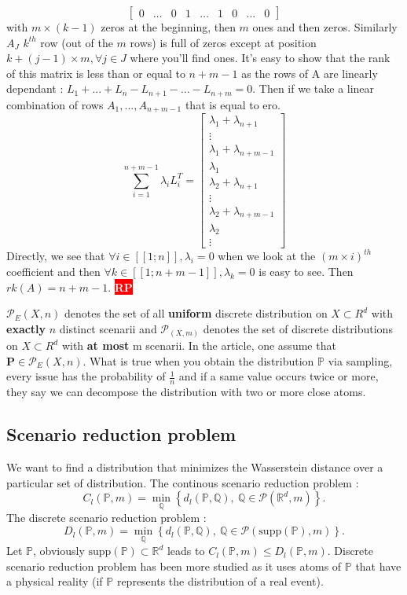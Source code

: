 \documentclass{amsart}
\newcommand{\nb}[3]{
		{\colorbox{#2}{\bfseries\sffamily\tiny\textcolor{white}{#1}}}
		{\textcolor{#2}{\text{$\blacktriangleright$}{\textcolor{#2}{#3}}\text{$\blacktriangleleft$}}}}
\newcommand{\rp}[1]{\nb{RP}{red}{#1}}
\begin{document}
$$\begin{bmatrix}
    0&\hdots&0&1&\hdots&1&0&\hdots&0
\end{bmatrix}$$
with $m\times(k-1)$ zeros at the beginning, then $m$ ones and then zeros. 
\newline
Similarly $A_J$ $k^{th}$ row (out of the $m$ rows) is full of zeros except at position $k+(j-1)\times m, \forall j\in J$ where you'll find ones. It's easy to show that the rank of this matrix is less than or equal to $n+m-1$ as the rows of A are linearly dependant : $L_1+...+L_n-L_{n+1}-...-L_{n+m}=0$. Then if we take a linear combination of rows $A_1,...,A_{n+m-1}$ that is equal to ero. $$
\sum_{i=1}^{n+m-1}\lambda_iL_i^T=\begin{bmatrix}
    \lambda_1+\lambda_{n+1}\\ \vdots\\ \lambda_1+\lambda_{n+m-1}\\ \lambda_{1} \\ \lambda_2+\lambda_{n+1} \\ \vdots \\ \lambda_2+\lambda_{n+m-1}\\ \lambda_2  \\ \vdots
\end{bmatrix}
$$
Directly, we see that $\forall i \in [\![1;n]\!], \lambda_i=0$ when we look at the $(m\times i)^{th}$ coefficient and then $\forall k\in[\![1;n+m-1]\!], \lambda_k=0$ is easy to see. Then $rk(A)=n+m-1$. \rp{kind of useless as we know that the number of variables in basis is $n+m$ (number of constraints) but can be the starting point of sparsity explanation if I study regularization as Benoît mentionned}
\newline

$\mathcal{P}_E(X,n)$ denotes the set of all \textbf{uniform} discrete distribution on $X\subset R^d$ with \textbf{exactly} $n$ distinct scenarii and $\mathcal{P}_(X,m)$ denotes the set of discrete distributions on $X\subset R^d$ with \textbf{at most} m scenarii. In the article, one assume that $\mathbf{P}\in\mathcal{P}_E(X,n)$. What is true when you obtain the distribution $\mathbb{P}$ via sampling, every issue has the probability of $\frac{1}{n}$ and if a same value occurs twice or more, they say we can decompose the distribution with two or more close atoms.
\subsection{Scenario reduction problem}
We want to find a distribution that minimizes the Wasserstein distance over a particular set of distribution. The continous scenario reduction problem :
$$
C_l(\mathbb{P},m)=\min_\mathbb{Q}\left\{d_l(\mathbb{P},\mathbb{Q}),\: \mathbb{Q}\in\mathcal{P}(\mathbb{R}^d,m)\right\}. 
$$
The discrete scenario reduction problem :
$$
D_l(\mathbb{P},m)=\min_\mathbb{Q}\left\{d_l(\mathbb{P},\mathbb{Q}),\: \mathbb{Q}\in\mathcal{P}(\text{supp}(\mathbb{P}),m)\right\}.
$$
Let $\mathbb{P}$, obviously $\text{supp}(\mathbb{P})\subset \mathbb{R}^d$ leads to $C_l(\mathbb{P},m)\leq D_l(\mathbb{P},m)$. Discrete scenario reduction problem has been more studied as it uses atoms of $\mathbb{P}$ that have a physical reality (if $\mathbb{P}$ represents the distribution of a real event).
\end{document}
